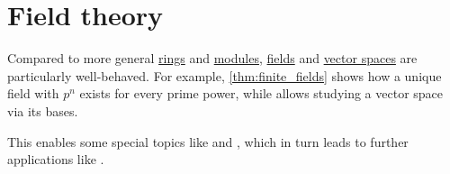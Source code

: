\chapter{Field theory}\label{ch:field_theory}

Compared to more general \hyperref[def:ring]{rings} and \hyperref[def:module]{modules}, \hyperref[def:field]{fields} and \hyperref[def:vector_space]{vector spaces} are particularly well-behaved. For example, \cref{thm:finite_fields} shows how a unique field with \( p^n \) exists for every prime power, while  allows studying a vector space via its bases.

This enables some special topics like  and , which in turn leads to further applications like .
